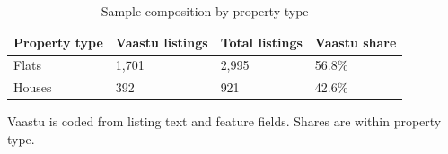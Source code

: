 \begin{table}[!htbp]
\centering
\caption{Sample composition by property type}
\label{tab:counts}
\begin{tabular}{llll}
\toprule
Property type & Vaastu listings & Total listings & Vaastu share \\
\midrule
Flats & 1,701 & 2,995 & 56.8\% \\
Houses & 392 & 921 & 42.6\% \\
\bottomrule
\end{tabular}

\vspace{0.3em}
\par\begin{minipage}{0.95\linewidth}\footnotesize Vaastu is coded from listing text and feature fields. Shares are within property type.\end{minipage}
\end{table}
